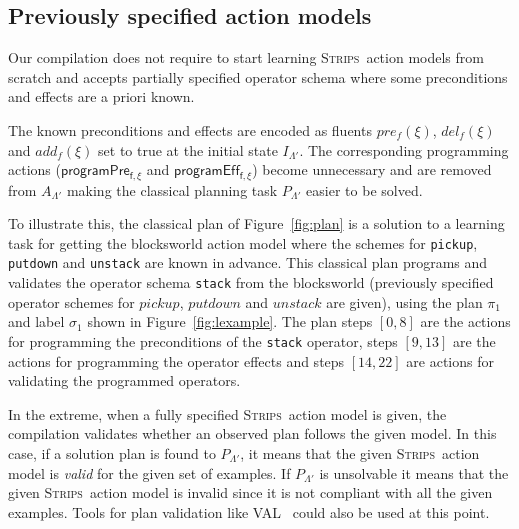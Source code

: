 \documentclass[letterpaper]{article} %
\newcommand{\strips}{\textsc{Strips}}     %
\begin{document}
\subsection{Previously specified action models}
Our compilation does not require to start learning \strips\ action models from scratch and accepts partially specified operator schema where some preconditions and effects are a priori known.

The known preconditions and effects are encoded as fluents $pre_f(\xi)$, $del_f(\xi)$ and $add_f(\xi)$ set to true at the initial state $I_{\Lambda'}$. The corresponding programming actions ($\mathsf{programPre_{f,\xi}}$ and $\mathsf{programEff_{f,\xi}}$) become unnecessary and are removed from $A_{\Lambda'}$ making the classical planning task $P_{\Lambda'}$ easier to be solved.

To illustrate this, the classical plan of Figure~\ref{fig:plan} is a solution to a learning task for getting the blocksworld action model where the schemes for {\tt\small pickup}, {\tt\small putdown} and {\tt\small unstack} are known in advance. This classical plan programs and validates the operator schema {\tt\small stack} from the blocksworld (previously specified operator schemes for $pickup$, $putdown$ and $unstack$ are given), using the plan $\pi_1$ and label $\sigma_1$ shown in Figure~\ref{fig:lexample}. The plan steps $[0,8]$ are the actions for programming the preconditions of the {\tt\small stack} operator, steps $[9,13]$ are the actions for programming the operator effects and steps $[14,22]$ are actions for validating the programmed operators. 

In the extreme, when a fully specified \strips\ action model is given, the compilation validates whether an observed plan follows the given model. In this case, if a solution plan is found to $P_{\Lambda'}$, it means that the given \strips\ action model is {\em valid} for the given set of examples. If $P_{\Lambda'}$ is unsolvable it means that the given \strips\ action model is invalid since it is not compliant with all the given examples. Tools for plan validation like VAL~\cite{howey2004val} could also be used at this point.
\end{document}
